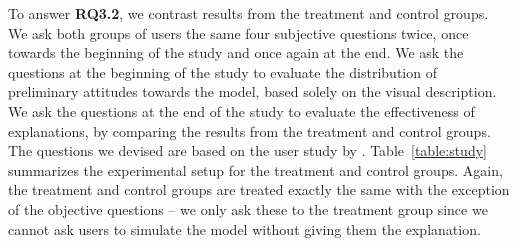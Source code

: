 To answer \textbf{RQ3.2}, we contrast results from the treatment and control groups. 
We ask both groups of users the same four subjective questions twice, once towards the beginning of the study and once again at the end. 
We ask the questions at the beginning of the study to evaluate the distribution of preliminary attitudes towards the model, based solely on the visual description. 
We ask the questions at the end of the study to evaluate the effectiveness of \OurMethod{} explanations, by comparing the results from the treatment and control groups. 
The questions we devised are based on the user study by \citet{terhoeve-2017-news}. 
Table~\ref{table:study} summarizes the experimental setup for the treatment and control groups. 
Again, the treatment and control groups are treated exactly the same with the exception of the objective questions -- we only ask these to the treatment group since we cannot ask users to simulate the model without giving them the explanation. 
